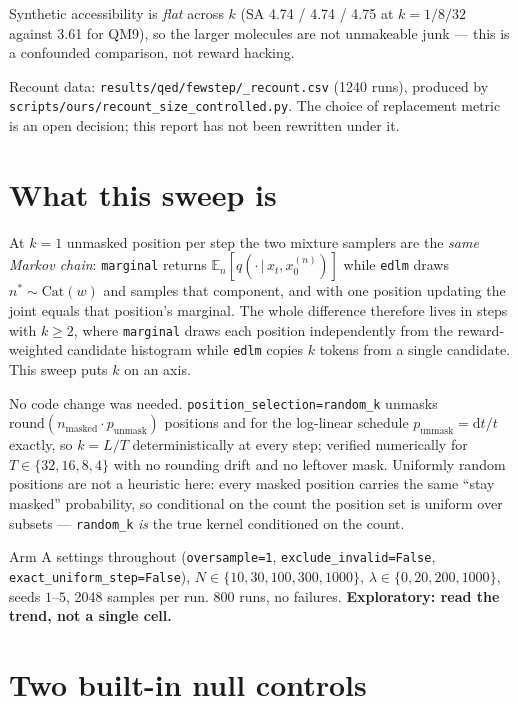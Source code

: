 \documentclass[11pt]{article}
\begin{document}
\begin{center}
{\begin{minipage}{0.93\textwidth}
\medskip
Synthetic accessibility is \emph{flat} across $k$ (SA 4.74 / 4.74 / 4.75 at
$k=1/8/32$ against 3.61 for QM9), so the larger molecules are not unmakeable
junk --- this is a confounded comparison, not reward hacking.

\medskip
Recount data: \texttt{results/qed/fewstep/\_recount.csv} (1240 runs), produced by
\texttt{scripts/ours/recount\_size\_controlled.py}. The choice of replacement
metric is an open decision; this report has not been rewritten under it.
\end{minipage}}
\end{center}

\bigskip

\section{What this sweep is}

At $k=1$ unmasked position per step the two mixture samplers are the
\emph{same Markov chain}: \texttt{marginal} returns
$\mathbb{E}_n[q(\cdot\,|\,x_t,x_0^{(n)})]$ while \texttt{edlm} draws
$n^\ast\sim\mathrm{Cat}(w)$ and samples that component, and with one position
updating the joint equals that position's marginal. The whole difference
therefore lives in steps with $k\ge 2$, where \texttt{marginal} draws each
position independently from the reward-weighted candidate histogram while
\texttt{edlm} copies $k$ tokens from a single candidate. This sweep puts $k$ on
an axis.

No code change was needed. \texttt{position\_selection=random\_k} unmasks
$\mathrm{round}(n_{\text{masked}}\cdot p_{\text{unmask}})$ positions and for the
log-linear schedule $p_{\text{unmask}} = \mathrm{d}t/t$ exactly, so
$k = L/T$ deterministically at every step; verified numerically for
$T\in\{32,16,8,4\}$ with no rounding drift and no leftover mask. Uniformly random
positions are not a heuristic here: every masked position carries the same
``stay masked'' probability, so conditional on the count the position set is
uniform over subsets --- \texttt{random\_k} \emph{is} the true kernel
conditioned on the count.

Arm A settings throughout (\texttt{oversample=1}, \texttt{exclude\_invalid=False},
\texttt{exact\_uniform\_step=False}), $N\in\{10,30,100,300,1000\}$,
$\lambda\in\{0,20,200,1000\}$, seeds $1$--$5$, 2048 samples per run.
800 runs, no failures. \textbf{Exploratory: read the trend, not a single cell.}

\section{Two built-in null controls}
\end{document}
